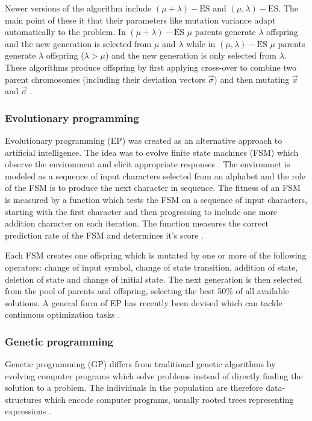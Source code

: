 Newer versions of the algorithm include $(\mu + \lambda)-\text{ES}$ and $(\mu,\lambda)-\text{ES}$. The main point of these it that their parameters like mutation variance adapt automatically to the problem. In $(\mu + \lambda)-\text{ES}$ $\mu$ parents generate $\lambda$ offspring and the new generation is selected from $\mu$ and $\lambda$ while in $(\mu,\lambda)-\text{ES}$ $\mu$ parents generate $\lambda$ offspring ($\lambda > \mu$) and the new generation is only selected from $\lambda$. These algorithms produce offspring by first applying cross-over to combine two parent chromosomes (including their deviation vectors $\vec{\sigma}$) and then mutating $\vec{x}$ and $\vec{\sigma}$ \cite{Michalewicz1997}.

\subsubsection{Evolutionary programming}

Evolutionary programming (EP) was created as an alternative approach to artificial intelligence. The idea was to evolve finite state machines (FSM) which observe the environment and elicit appropriate responses \cite{Fogel1996}. The environmet is modeled as a sequence of input characters selected from an alphabet and the role of the FSM is to produce the next character in sequence. The fitness of an FSM is measured by a function which tests the FSM on a sequence of input characters, starting with the first character and then progressing to include one more addition character on each iteration. The function measures the correct prediction rate of the FSM and determines it's score \cite{Michalewicz1997}.

Each FSM creates one offspring which is mutated by one or more of the following operators: change of input symbol, change of state transition, addition of state, deletion of state and change of initial state. The next generation is then selected from the pool of parents and offspring, selecting the best 50\% of all available solutions. A general form of EP has recently been devised which can tackle continuous optimization tasks \cite{Michalewicz1997}.

\subsubsection{Genetic programming}

Genetic programming (GP) differs from traditional genetic algorithms by evolving computer programs which solve problems instead of directly finding the solution to a problem. The individuals in the population are therefore data-structures which encode computer programs, usually rooted trees representing expressions \cite{Michalewicz1997}.

